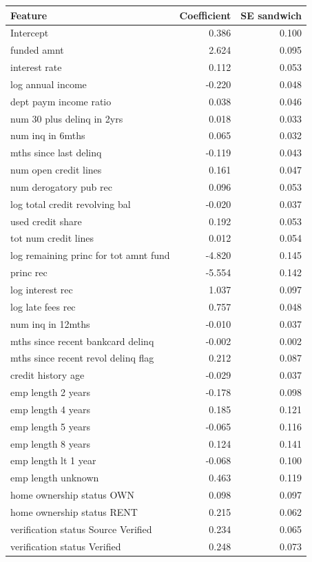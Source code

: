 \begin{tabular}{lrr}
\toprule
Feature & Coefficient & SE sandwich \\
\midrule
Intercept & 0.386 & 0.100 \\
funded amnt & 2.624 & 0.095 \\
interest rate & 0.112 & 0.053 \\
log annual income & -0.220 & 0.048 \\
dept paym income ratio & 0.038 & 0.046 \\
num 30 plus  delinq in 2yrs & 0.018 & 0.033 \\
num inq in 6mths & 0.065 & 0.032 \\
mths since last delinq & -0.119 & 0.043 \\
num open credit lines & 0.161 & 0.047 \\
num derogatory pub rec & 0.096 & 0.053 \\
log total credit revolving bal & -0.020 & 0.037 \\
used credit share & 0.192 & 0.053 \\
tot num credit lines & 0.012 & 0.054 \\
log remaining princ for tot amnt fund & -4.820 & 0.145 \\
princ rec & -5.554 & 0.142 \\
log interest rec & 1.037 & 0.097 \\
log late fees rec & 0.757 & 0.048 \\
num inq in 12mths & -0.010 & 0.037 \\
mths since recent bankcard delinq & -0.002 & 0.002 \\
mths since recent revol delinq flag & 0.212 & 0.087 \\
credit history age & -0.029 & 0.037 \\
emp length 2 years & -0.178 & 0.098 \\
emp length 4 years & 0.185 & 0.121 \\
emp length 5 years & -0.065 & 0.116 \\
emp length 8 years & 0.124 & 0.141 \\
emp length  lt  1 year & -0.068 & 0.100 \\
emp length unknown & 0.463 & 0.119 \\
home ownership status OWN & 0.098 & 0.097 \\
home ownership status RENT & 0.215 & 0.062 \\
verification status Source Verified & 0.234 & 0.065 \\
verification status Verified & 0.248 & 0.073 \\

\end{tabular}
